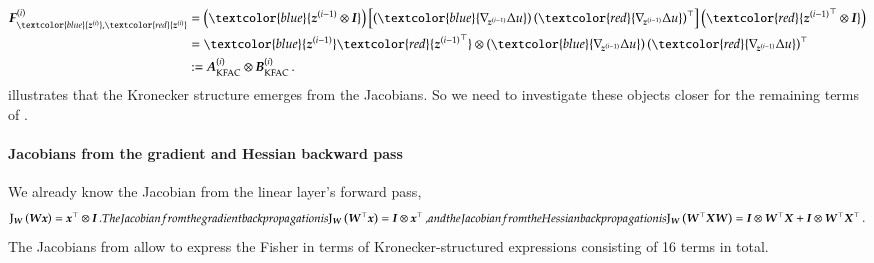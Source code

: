 \begin{align}\label{eq:original-kfac}
  \begin{split}
    \mF^{(i)}_{\textcolor{blue}{\vz^{(i)}}, \textcolor{red}{\vz^{(i)}}}
    &=
      \left(
      \textcolor{blue}{\vz^{(i-1)} \otimes \mI}
      \right)
      \left[
      \left(
      \textcolor{blue}{\grad{\vz^{(i-1)}}\Delta u}
      \right)
      \left(
      \textcolor{red}{\grad{\vz^{(i-1)}}\Delta u}
      \right)^{\top}
      \right]
      \left(
      \textcolor{red}{{\vz^{(i-1)}}^{\top} \otimes \mI}
      \right)
    \\
    &=
      \textcolor{blue}{\vz^{(i-1)}}
      \textcolor{red}{{\vz^{(i-1)}}^{\top}}
      \otimes
      \left(
      \textcolor{blue}{\grad{\vz^{(i-1)}}\Delta u}
      \right)
      \left(
      \textcolor{red}{\grad{\vz^{(i-1)}}\Delta u}
      \right)^{\top}
    \\
    &:= \mA_{\text{KFAC}}^{(i)} \otimes \mB_{\text{KFAC}}^{(i)}\,.
  \end{split}
\end{align}
 illustrates that the Kronecker structure emerges from
the Jacobians. So we need to investigate these objects closer for the remaining
terms of .

\paragraph{Jacobians from the gradient and Hessian backward pass} We already know the Jacobian from the linear layer's forward pass,
\begin{subequations}\label{eq:fisher-jacobians}
  \begin{align}
    \jac_{\mW}\left( \mW \vx \right) = \vx^{\top} \otimes \mI\,.
  \end{align}
  The Jacobian from the gradient backpropagation is
  \begin{align}
    \jac_{\mW}\left( \mW^{\top} \vx \right) = \mI \otimes \vx^{\top}\,,
  \end{align}
  and the Jacobian from the Hessian backpropagation is
  \begin{align}
    \jac_{\mW}\left( \mW^{\top} \mX \mW \right) = \mI \otimes \mW^{\top}\mX + \mI \otimes \mW^{\top}\mX^{\top}\,.
  \end{align}
\end{subequations}
The Jacobians from  allow to express the Fisher in
terms of Kronecker-structured expressions consisting of 16 terms in total.


